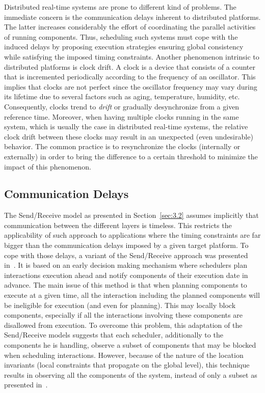 Distributed real-time systems are prone to different kind of problems. The immediate concern 
is the communication delays inherent to distributed platforms. The latter increases considerably
the effort of coordinating the parallel activities of running components. Thus, scheduling
such systems must cope with the induced delays by proposing execution strategies ensuring 
global consistency while satisfying the imposed timing constraints.
Another phenomenon intrinsic to distributed platforms is clock drift. A clock is a device
that consists of a counter that is incremented periodically according to the frequency of 
an oscillator. This implies that clocks are not perfect since the oscillator frequency may
vary during its lifetime due to several factors such as aging, temperature, humidity, etc.
Consequently, clocks trend to \emph{drift} or gradually desynchronize from a given reference 
time. Moreover, when having multiple clocks running in the same system, which is usually the
case in distributed real-time systems, the relative clock drift between these clocks
may result in an unexpected (even undesirable) behavior. The common practice is to 
resynchronize the clocks (internally or externally) in order to bring the difference to 
a certain threshold to minimize the impact of this phenomenon. 

\subsection{Communication Delays}

The Send/Receive model as presented in Section~\ref{sec:3.2} assumes implicitly that 
communication between the different layers is timeless. This restricts the applicability
of such approach to applications where the timing constraints are far bigger than the 
communication delays imposed by a given target platform.  
To cope with those delays, a variant of the Send/Receive approach was presented in~\cite{}. 
It is based on an early decision making mechanism where schedulers plan interactions execution 
ahead and notify components of their execution date in advance. 
The main issue of this method is that when planning components to execute at a given time,
all the interaction including the planned components will be ineligible for execution (and even
for planning). This may locally block components, especially if all the interactions 
involving these components are disallowed from execution. To overcome this problem,
this adaptation of the Send/Receive models suggests that each scheduler, additionally to the
components he is handling, observe a subset of components that may be blocked when 
scheduling interactions. However, because of the nature of the location invariants (local
constraints that propagate on the global level), this technique results in observing
all the components of the system, instead of only a subset as presented in~\cite{}.

